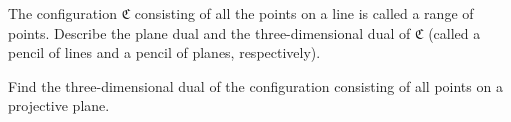 The configuration $\mathfrak{C}$ consisting of all the points on a line is called a range of points. Describe the plane dual and the three-dimensional dual of $\mathfrak{C}$ (called a pencil of lines and a pencil of planes, respectively).

Find the three-dimensional dual of the configuration consisting of all points on a projective plane.
